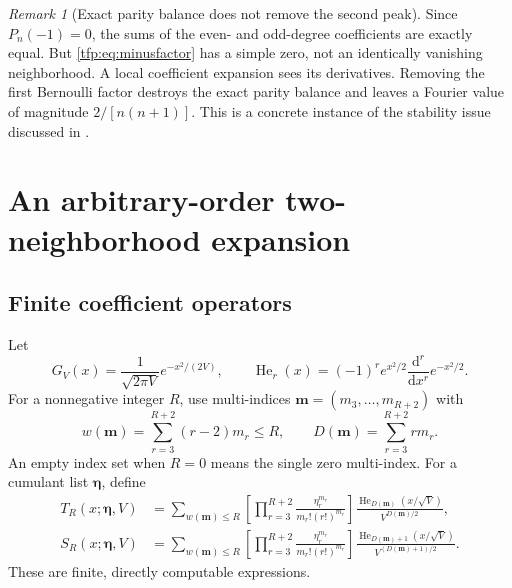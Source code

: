 \documentclass[11pt,a4paper]{article}
\numberwithin{equation}{section}
\theoremstyle{definition}\newtheorem{definition}[theorem]{Definition}
\theoremstyle{remark}\newtheorem{remark}[theorem]{Remark}
\newcommand{\He}{\operatorname{He}}
\newcommand{\dd}{\mathrm d}
\begin{document}
\begin{remark}[Exact parity balance does not remove the second peak]
Since $P_n(-1)=0$, the sums of the even- and odd-degree coefficients
are exactly equal. But \eqref{tfp:eq:minusfactor} has a simple zero, not an
identically vanishing neighborhood. A local coefficient expansion sees
its derivatives. Removing the first Bernoulli factor destroys the exact
parity balance and leaves a Fourier value of magnitude $2/[n(n+1)]$.
This is a concrete instance of the stability issue discussed in
\cite{dolgopyat}.
\end{remark}

\section{An arbitrary-order two-neighborhood expansion}\label{tfp:sec:allorders}
\subsection{Finite coefficient operators}
Let
\begin{equation}
 G_V(x)=\frac1{\sqrt{2\pi V}}e^{-x^2/(2V)},
 \qquad
 \He_r(x)=(-1)^r e^{x^2/2}\frac{\dd^r}{\dd x^r}e^{-x^2/2}.
\end{equation}
For a nonnegative integer $R$, use multi-indices
$\mathbf m=(m_3,\ldots,m_{R+2})$ with
\begin{equation}
 w(\mathbf m)=\sum_{r=3}^{R+2}(r-2)m_r\le R,
 \qquad D(\mathbf m)=\sum_{r=3}^{R+2}r m_r.
\end{equation}
An empty index set when $R=0$ means the single zero multi-index.
For a cumulant list $\boldsymbol\eta$, define
\begin{align}
 T_R(x;\boldsymbol\eta,V)
 &=\sum_{w(\mathbf m)\le R}
   \left[\prod_{r=3}^{R+2}
       \frac{\eta_r^{m_r}}{m_r!(r!)^{m_r}}\right]
       \frac{\He_{D(\mathbf m)}(x/\sqrt V)}{V^{D(\mathbf m)/2}},
       \label{tfp:eq:TR}\\
 S_R(x;\boldsymbol\eta,V)
 &=\sum_{w(\mathbf m)\le R}
   \left[\prod_{r=3}^{R+2}
       \frac{\eta_r^{m_r}}{m_r!(r!)^{m_r}}\right]
       \frac{\He_{D(\mathbf m)+1}(x/\sqrt V)}{V^{(D(\mathbf m)+1)/2}}.
       \label{tfp:eq:SR}
\end{align}
These are finite, directly computable expressions.
\end{document}
